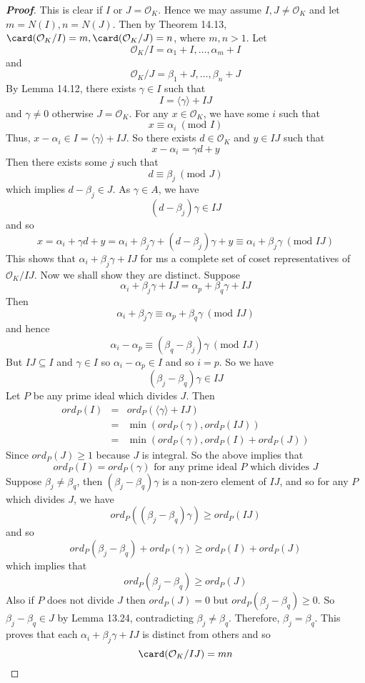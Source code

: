\begin{proof}[\bf Proof] This is clear if $I$ or $J=\mathcal{O}_K$. Hence we may assume $I,J \neq \mathcal{O}_K$ and let
$m=N(I),n=N(J)$. Then by Theorem 14.13, $\card(\mathcal{O}_K/I)=m,\card(\mathcal{O}_K/J)=n$, where $m,n >1$.
Let
$$\mathcal{O}_K/I=\alpha_1+I,\ldots,\alpha_m+I$$
and
$$\mathcal{O}_K/J=\beta_1+J,\ldots,\beta_n+J$$
By Lemma 14.12, there exists $\gamma \in I$ such that
$$I=\langle \gamma \rangle +IJ$$
and $\gamma \neq 0$ otherwise $J=\mathcal{O}_K$. For any $x \in \mathcal{O}_K$, we have some $i$ such that
$$x \equiv \alpha_i~(\text{mod } I)$$
Thus, $x-\alpha_i \in I=\langle \gamma \rangle +IJ$.
So there exists $d \in \mathcal{O}_K$ and $y \in IJ$ such that
$$x -\alpha_i=\gamma d+ y$$
Then there exists some $j$ such that
$$d \equiv \beta_j~(\text{mod } J)$$
which implies $d-\beta_j \in J$.
As $\gamma \in A$, we have
$$(d-\beta_j)\gamma \in IJ$$
and so
$$x=\alpha_i+\gamma d+y=\alpha_i+\beta_j \gamma +(d-\beta_j)\gamma +y \equiv \alpha_i+\beta_j \gamma
~(\text{mod }IJ)$$
This shows that $\alpha_i+\beta_j \gamma +IJ$ for ms a complete set of coset representatives of $\mathcal{O}_K/IJ$.
Now we shall show they are distinct.
Suppose $$\alpha_i+\beta_j\gamma+IJ=\alpha_p+\beta_q\gamma+IJ$$
Then
$$\alpha_i+\beta_j\gamma \equiv \alpha_p+\beta_q\gamma ~(\text{mod } IJ)$$
and hence
$$\alpha_i-\alpha_p \equiv (\beta_q-\beta_j)\gamma~(\text{mod }IJ)$$
But $IJ \subseteq I$ and $\gamma \in I$ so $\alpha_i-\alpha_p \in I$ and so $i=p$.
So we have
$$(\beta_j-\beta_q)\gamma \in IJ$$
Let $P$ be any prime ideal which divides $J$. Then
\begin{eqnarray*}
ord_P(I)&=&ord_P(\langle \gamma \rangle +IJ)\\
&=&\min{(ord_P(\gamma),ord_P(IJ))}\\
&=&\min{(ord_P(\gamma),ord_P(I)+ord_P(J))}
\end{eqnarray*}
Since $ord_P(J) \ge 1$ because $J$ is integral. So the above implies that
$$ord_P(I)=ord_P(\gamma) \text{ for any prime ideal } P \text{ which divides } J$$
Suppose $\beta_j \neq \beta_q$, then $(\beta_j-\beta_q)\gamma$ is a non-zero element of $IJ$, and so for any $P$ which divides $J$,  we have
$$ord_P((\beta_j-\beta_q)\gamma) \ge ord_P(IJ)$$
and so
$$ord_P(\beta_j-\beta_q)+ord_P(\gamma) \ge ord_P(I)+ord_P(J)$$
which implies that
$$ord_P(\beta_j-\beta_q) \ge ord_P(J)$$
Also if $P$ does not divide $J$ then $ord_P(J)=0$ but $ord_P(\beta_j-\beta_q) \ge 0$.
So $\beta_j-\beta_q \in J$ by Lemma 13.24, contradicting $\beta_j \neq \beta_q$.
Therefore, $\beta_j=\beta_q$. This proves that each
$\alpha_i+\beta_j\gamma+IJ$ is distinct from others and so
$$\card(\mathcal{O}_K/IJ)=mn$$
\end{proof}
